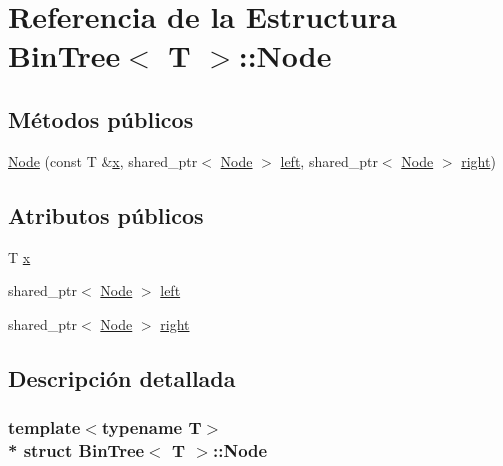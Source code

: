 \hypertarget{struct_bin_tree_1_1_node}{}\section{Referencia de la Estructura Bin\+Tree$<$ T $>$\+:\+:Node}
\label{struct_bin_tree_1_1_node}
\subsection*{Métodos públicos}
\begin{DoxyCompactItemize}
\item 
\hyperlink{struct_bin_tree_1_1_node_af45885e303875c018e89fa5c8b96bde0}{Node} (const T \&\hyperlink{struct_bin_tree_1_1_node_a9c268d4af01559e8237dbeb5bd19af91}{x}, shared\+\_\+ptr$<$ \hyperlink{struct_bin_tree_1_1_node}{Node} $>$ \hyperlink{struct_bin_tree_1_1_node_a265a6367635a38838e6a6366564be78d}{left}, shared\+\_\+ptr$<$ \hyperlink{struct_bin_tree_1_1_node}{Node} $>$ \hyperlink{struct_bin_tree_1_1_node_a6df770137090da60cd0376ce06893cbd}{right})
\end{DoxyCompactItemize}
\subsection*{Atributos públicos}
\begin{DoxyCompactItemize}
\item 
T \hyperlink{struct_bin_tree_1_1_node_a9c268d4af01559e8237dbeb5bd19af91}{x}
\item 
shared\+\_\+ptr$<$ \hyperlink{struct_bin_tree_1_1_node}{Node} $>$ \hyperlink{struct_bin_tree_1_1_node_a265a6367635a38838e6a6366564be78d}{left}
\item 
shared\+\_\+ptr$<$ \hyperlink{struct_bin_tree_1_1_node}{Node} $>$ \hyperlink{struct_bin_tree_1_1_node_a6df770137090da60cd0376ce06893cbd}{right}
\end{DoxyCompactItemize}


\subsection{Descripción detallada}
\subsubsection*{template$<$typename T$>$\\*
struct Bin\+Tree$<$ T $>$\+::\+Node}



